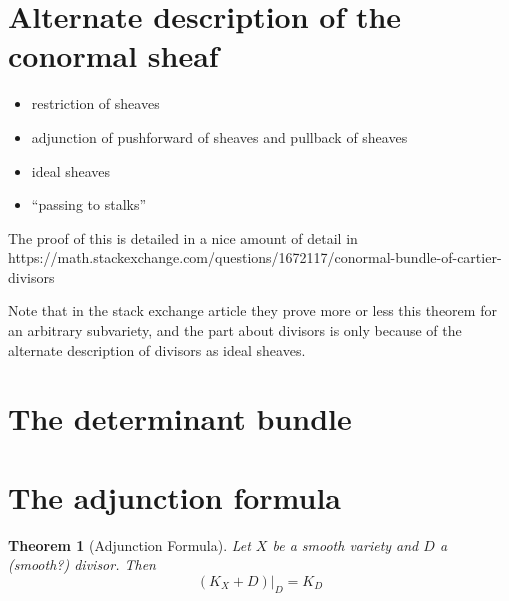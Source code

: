 \documentclass[a4paper]{article}
\newtheorem{thm}{Theorem}[section]
\begin{document}



\section{Alternate description of the conormal sheaf}

\begin{itemize}
	\item restriction of sheaves
	\item adjunction of pushforward of sheaves and pullback of sheaves
	\item ideal sheaves
	\item ``passing to stalks''
\end{itemize}

The proof of this is detailed in a nice amount of detail in
https://math.stackexchange.com/questions/1672117/conormal-bundle-of-cartier-divisors

Note that in the stack exchange article they prove more or less this 
theorem for an arbitrary subvariety, and the part about divisors
is only because of the alternate description of divisors as ideal sheaves.

\section{The determinant bundle}


\section{The adjunction formula}


\begin{thm}[Adjunction Formula]
	Let \(X\) be a smooth variety and \(D\) a
	(smooth?) divisor. 
	Then 
	\[
		(K_{X} + D)|_{D} = K_{D}
	\] 
	
\end{thm}
\end{document}
